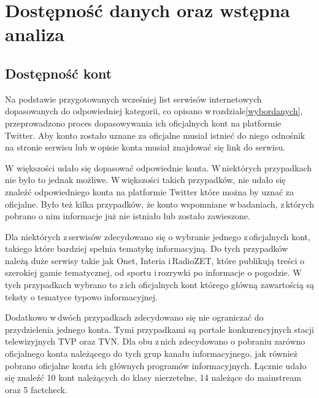 \newpage
\section{Dostępność danych oraz wstępna analiza}
\subsection{Dostępność kont }
Na podstawie przygotowanych wcześniej list serwisów internetowych dopasowanych do odpowiedniej kategorii, co opisano w\,rozdziale\ref{wybordanych}, przeprowadzono proces dopasowywania ich oficjalnych kont na platformie Twitter. Aby konto zostało uznane za oficjalne musiał istnieć do niego odnośnik na stronie serwisu lub w\,opisie konta musiał znajdować się link do serwisu. 
\par
W większości udało się dopasować odpowiednie konta. W\,niektórych przypadkach nie było to jednak możliwe. W\,większości takich przypadków, nie udało się znaleźć odpowiedniego konta na platformie Twitter które można by uznać za oficjalne. Było też kilka przypadków, że konto wspomniane w\,badaniach, z\,których pobrano o nim informacje już nie istniało lub zostało zawieszone.
\par
Dla niektórych z\,serwisów zdecydowano się o wybranie jednego z\,oficjalnych kont, takiego które bardziej spełnia tematykę informacyjną. Do tych przypadków należą duże serwisy takie jak Onet, Interia i\,RadioZET, które publikują treści o szerokiej gamie tematycznej, od sportu i\,rozrywki po informacje o pogodzie.  W\,tych przypadkach wybrano to z\,ich oficjalnych kont którego główną zawartością są teksty o tematyce typowo informacyjnej. 
\par
Dodatkowo w\,dwóch przypadkach zdecydowano się nie ograniczać do przydzielenia jednego konta. Tymi przypadkami są portale konkurencyjnych stacji telewizyjnych TVP oraz TVN. Dla obu z\,nich zdecydowano o pobraniu zarówno oficjalnego konta należącego do tych grup kanału informacyjnego, jak również pobrano oficjalne konta ich głównych programów informacyjnych. 
Łącznie udało się znaleźć 10 kont należących do klasy nierzetelne, 14 należące do mainstream oraz 5 factcheck.

